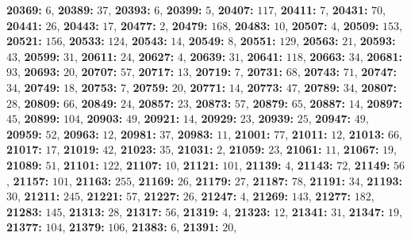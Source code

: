 \textsf{\bfseries 20369:} $6$, \textsf{\bfseries 20389:} $37$, \textsf{\bfseries 20393:} $6$, \textsf{\bfseries 20399:} $5$, \textsf{\bfseries 20407:} $117$, \textsf{\bfseries 20411:} $7$, \textsf{\bfseries 20431:} $70$, \textsf{\bfseries 20441:} $26$, \textsf{\bfseries 20443:} $17$, \textsf{\bfseries 20477:} $2$, \textsf{\bfseries 20479:} $168$, \textsf{\bfseries 20483:} $10$, \textsf{\bfseries 20507:} $4$, \textsf{\bfseries 20509:} $153$, \textsf{\bfseries 20521:} $156$, \textsf{\bfseries 20533:} $124$, \textsf{\bfseries 20543:} $14$, \textsf{\bfseries 20549:} $8$, \textsf{\bfseries 20551:} $129$, \textsf{\bfseries 20563:} $21$, \textsf{\bfseries 20593:} $43$, \textsf{\bfseries 20599:} $31$, \textsf{\bfseries 20611:} $24$, \textsf{\bfseries 20627:} $4$, \textsf{\bfseries 20639:} $31$, \textsf{\bfseries 20641:} $118$, \textsf{\bfseries 20663:} $34$, \textsf{\bfseries 20681:} $93$, \textsf{\bfseries 20693:} $20$, \textsf{\bfseries 20707:} $57$, \textsf{\bfseries 20717:} $13$, \textsf{\bfseries 20719:} $7$, \textsf{\bfseries 20731:} $68$, \textsf{\bfseries 20743:} $71$, \textsf{\bfseries 20747:} $34$, \textsf{\bfseries 20749:} $18$, \textsf{\bfseries 20753:} $7$, \textsf{\bfseries 20759:} $20$, \textsf{\bfseries 20771:} $14$, \textsf{\bfseries 20773:} $47$, \textsf{\bfseries 20789:} $34$, \textsf{\bfseries 20807:} $28$, \textsf{\bfseries 20809:} $66$, \textsf{\bfseries 20849:} $24$, \textsf{\bfseries 20857:} $23$, \textsf{\bfseries 20873:} $57$, \textsf{\bfseries 20879:} $65$, \textsf{\bfseries 20887:} $14$, \textsf{\bfseries 20897:} $45$, \textsf{\bfseries 20899:} $104$, \textsf{\bfseries 20903:} $49$, \textsf{\bfseries 20921:} $14$, \textsf{\bfseries 20929:} $23$, \textsf{\bfseries 20939:} $25$, \textsf{\bfseries 20947:} $49$, \textsf{\bfseries 20959:} $52$, \textsf{\bfseries 20963:} $12$, \textsf{\bfseries 20981:} $37$, \textsf{\bfseries 20983:} $11$, \textsf{\bfseries 21001:} $77$, \textsf{\bfseries 21011:} $12$, \textsf{\bfseries 21013:} $66$, \textsf{\bfseries 21017:} $17$, \textsf{\bfseries 21019:} $42$, \textsf{\bfseries 21023:} $35$, \textsf{\bfseries 21031:} $2$, \textsf{\bfseries 21059:} $23$, \textsf{\bfseries 21061:} $11$, \textsf{\bfseries 21067:} $19$, \textsf{\bfseries 21089:} $51$, \textsf{\bfseries 21101:} $122$, \textsf{\bfseries 21107:} $10$, \textsf{\bfseries 21121:} $101$, \textsf{\bfseries 21139:} $4$, \textsf{\bfseries 21143:} $72$, \textsf{\bfseries 21149:} $56$, \textsf{\bfseries 21157:} $101$, \textsf{\bfseries 21163:} $255$, \textsf{\bfseries 21169:} $26$, \textsf{\bfseries 21179:} $27$, \textsf{\bfseries 21187:} $78$, \textsf{\bfseries 21191:} $34$, \textsf{\bfseries 21193:} $30$, \textsf{\bfseries 21211:} $245$, \textsf{\bfseries 21221:} $57$, \textsf{\bfseries 21227:} $26$, \textsf{\bfseries 21247:} $4$, \textsf{\bfseries 21269:} $143$, \textsf{\bfseries 21277:} $182$, \textsf{\bfseries 21283:} $145$, \textsf{\bfseries 21313:} $28$, \textsf{\bfseries 21317:} $56$, \textsf{\bfseries 21319:} $4$, \textsf{\bfseries 21323:} $12$, \textsf{\bfseries 21341:} $31$, \textsf{\bfseries 21347:} $19$, \textsf{\bfseries 21377:} $104$, \textsf{\bfseries 21379:} $106$, \textsf{\bfseries 21383:} $6$, \textsf{\bfseries 21391:} $20$, 
